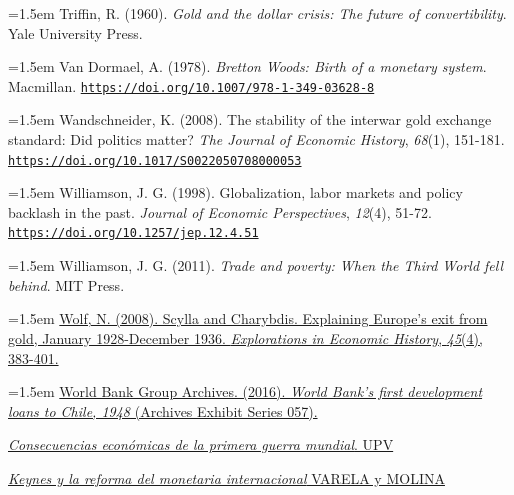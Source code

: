 \documentclass[10pt,a4paper]{article}
\begin{document}
{\sloppy\noindent\hangindent=1.5em Triffin, R. (1960). \textit{Gold and the dollar crisis: The future of convertibility}. Yale University Press.\par}

{\sloppy\noindent\hangindent=1.5em Van Dormael, A. (1978). \textit{Bretton Woods: Birth of a monetary system}. Macmillan. \href{https://doi.org/10.1007/978-1-349-03628-8}{\nolinkurl{https://doi.org/10.1007/978-1-349-03628-8}}\par}

{\sloppy\noindent\hangindent=1.5em Wandschneider, K. (2008). The stability of the interwar gold exchange standard: Did politics matter? \textit{The Journal of Economic History}, \textit{68}(1), 151-181. \href{https://doi.org/10.1017/S0022050708000053}{\nolinkurl{https://doi.org/10.1017/S0022050708000053}}\par}

{\sloppy\noindent\hangindent=1.5em Williamson, J. G. (1998). Globalization, labor markets and policy backlash in the past. \textit{Journal of Economic Perspectives}, \textit{12}(4), 51-72. \href{https://doi.org/10.1257/jep.12.4.51}{\nolinkurl{https://doi.org/10.1257/jep.12.4.51}}\par}

\noindent\hangindent=1.5em Williamson, J. G. (2011). \textit{Trade and poverty: When the Third World fell behind}. MIT Press.

{\sloppy\noindent\hangindent=1.5em \href{https://econpapers.repec.org/RePEc:eee:exehis:v:45:y:2008:i:4:p:383-401}{Wolf, N. (2008). Scylla and Charybdis. Explaining Europe's exit from gold, January 1928-December 1936. \textit{Explorations in Economic History}, \textit{45}(4), 383-401.}\par}

{\sloppy\noindent\hangindent=1.5em \href{https://documents1.worldbank.org/curated/en/308691468185347709/text/World-Bank-s-First-Development-Loans-to-Chile-1948.txt}{World Bank Group Archives. (2016). \textit{World Bank's first development loans to Chile, 1948} (Archives Exhibit Series 057).}\par}



\href{https://ocw.ehu.eus/pluginfile.php/41139/mod_resource/content/1/Tema_5/Aldcroft-Consecuencias_economicas_de_la_Gran_Guerra.pdf}{\textit{Consecuencias económicas de la primera guerra mundial}. UPV}

\href{https://www.funcas.es/wp-content/uploads/Migracion/Articulos/FUNCAS_PEE/017art14.pdf}{\textit{Keynes y la reforma del monetaria internacional} VARELA y MOLINA}
\end{document}
